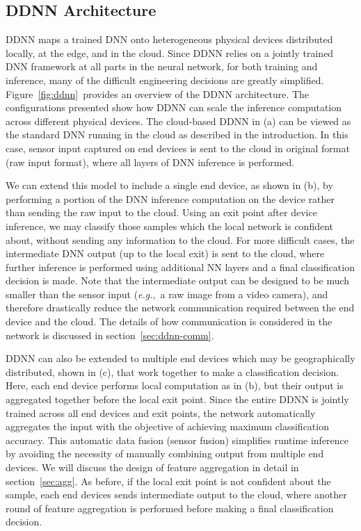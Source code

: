 \documentclass[10pt, conference, compsocconf]{IEEEtran}
\newcommand{\eg}{\emph{e.g.}}
\begin{document}
\subsection{DDNN Architecture}
DDNN maps a trained DNN onto heterogeneous physical devices distributed locally, at the edge, and in the cloud. Since DDNN relies on a jointly trained DNN framework at all parts in the neural network, for both training and inference, many of the difficult engineering decisions are greatly simplified. Figure~\ref{fig:ddnn}~provides an overview of the DDNN architecture. The configurations presented show how DDNN can scale the inference computation across different physical devices. The cloud-based DDNN in (a) can be viewed as the standard DNN running in the cloud as described in the introduction. In this case, sensor input captured on end devices is sent to the cloud in original format (raw input format), where all layers of DNN inference is performed. 

We can extend this model to include a single end device, as shown in (b), by performing a portion of the DNN inference computation on the device rather than sending the raw input to the cloud. Using an exit point after device inference, we may classify those samples which the local network is confident about, without sending any information to the cloud. For more difficult cases, the intermediate DNN output (up to the local exit) is sent to the cloud, where further inference is performed using additional NN layers and a final classification decision is made. Note that the intermediate output can be designed to be much smaller than the sensor input (\eg,~a raw image from a video camera), and therefore drastically reduce the network communication required between the end device and the cloud. The details of how communication is considered in the network is discussed in section~\ref{sec:ddnn-comm}.

DDNN can also be extended to multiple end devices which may be geographically distributed, shown in (c), that work together to make a classification decision. Here, each end device performs local computation as in (b), but their output is aggregated together before the local exit point. Since the entire DDNN is jointly trained across all end devices and exit points, the network automatically aggregates the input with the objective of achieving maximum classification accuracy. This automatic data fusion (sensor fusion) simplifies runtime inference by avoiding the necessity of manually combining output from multiple end devices. We will discuss the design of feature aggregation in detail in section~\ref{sec:agg}. As before, if the local exit point is not confident about the sample, each end devices sends intermediate output to the cloud, where another round of feature aggregation is performed before making a final classification decision.
\end{document}
